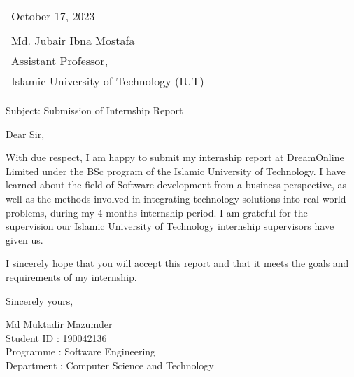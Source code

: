 


\begin{flushleft}
\begin{tabular}{@{} l}
	October 17, 2023 \\
         \\
	Md. Jubair Ibna Mostafa \\
	Assistant Professor, \\
	Islamic University of Technology (IUT) \\
\end{tabular}

\vspace{0.5cm}
Subject: Submission of Internship Report

\bigskip %

Dear Sir,

\bigskip %

With due respect, I am happy to submit my internship report at DreamOnline Limited under the BSc program of the Islamic University of Technology. I have learned about the field of Software development from a business perspective, as well as the methods involved in integrating technology solutions into real-world problems, during my 4 months internship period. I am grateful for the supervision our Islamic University of Technology internship supervisors have given us.


\vspace{0.4cm}
I sincerely hope that you will accept this report and that it meets the goals and requirements of my internship. 

\bigskip %

Sincerely yours,

\vspace{0.6cm} %

Md Muktadir Mazumder \\
Student ID : 190042136 \\
Programme : Software Engineering \\
Department : Computer Science and Technology
\end{flushleft}


